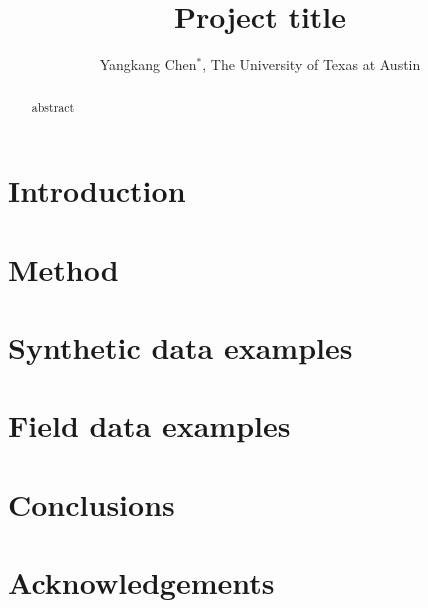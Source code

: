 \title{Project title}

\author{Yangkang Chen$^*$, The University of Texas at Austin}

\maketitle

\begin{abstract}
abstract
\end{abstract}

\section{Introduction}

\section{Method}

\section{Synthetic data examples}

\section{Field data examples}

 
\section{Conclusions}


\section{Acknowledgements}


\onecolumn






